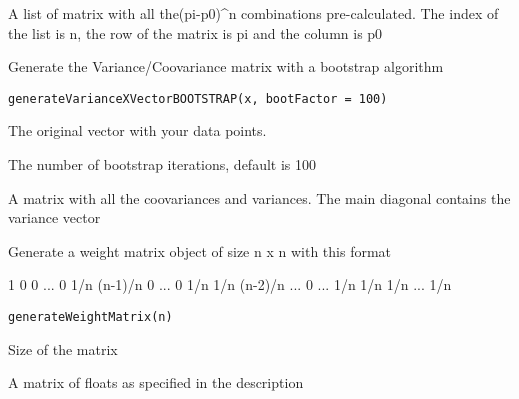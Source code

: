 \documentclass[letterpaper]{book}
\begin{document}
%
\begin{Value}
A list of matrix with all the(pi-p0)\textasciicircum{}n combinations pre-calculated.
The index of the list is n, the row of the matrix is pi and the column is p0
\end{Value}
%
\begin{Description}\relax
Generate the Variance/Coovariance matrix with a bootstrap algorithm
\end{Description}
%
\begin{Usage}
\begin{verbatim}
generateVarianceXVectorBOOTSTRAP(x, bootFactor = 100)
\end{verbatim}
\end{Usage}
%
\begin{Arguments}
\begin{ldescription}
\item[\code{x}] The original vector with your data points.

\item[\code{bootFactor}] The number of bootstrap iterations, default is 100
\end{ldescription}
\end{Arguments}
%
\begin{Value}
A matrix with all the coovariances and variances. The main diagonal contains the variance vector
\end{Value}
%
\begin{Description}\relax
Generate a weight matrix object of size n x n with this format

1    0       0      ... 0
1/n (n-1)/n  0      ... 0
1/n  1/n    (n-2)/n ... 0
...
1/n  1/n     1/n    ... 1/n
\end{Description}
%
\begin{Usage}
\begin{verbatim}
generateWeightMatrix(n)
\end{verbatim}
\end{Usage}
%
\begin{Arguments}
\begin{ldescription}
\item[\code{n}] Size of the matrix
\end{ldescription}
\end{Arguments}
%
\begin{Value}
A matrix of floats as specified in the description
\end{Value}
\end{document}
